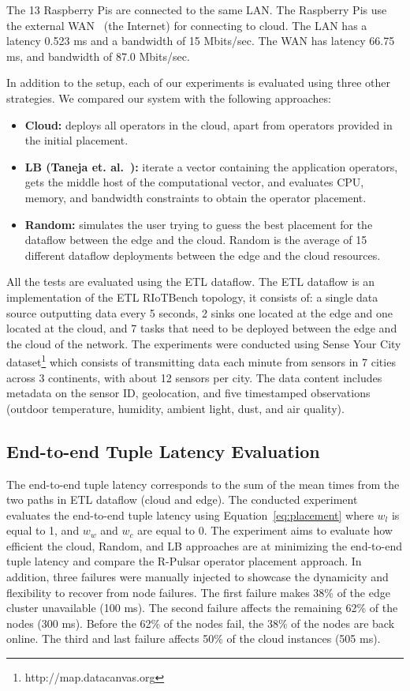 \noindent The 13 Raspberry Pis are connected to the same LAN. The Raspberry Pis use the external WAN~\cite{Ha:2013} (the Internet) for connecting to cloud. The LAN has a latency 0.523 ms and a bandwidth of 15 Mbits/sec. The WAN has latency 66.75 ms, and bandwidth of 87.0 Mbits/sec.

\noindent In addition to the setup, each of our experiments is evaluated using three other strategies. We compared our system with the following approaches:

\begin{itemize}	
\item \textbf{Cloud:} deploys all operators in the cloud, apart from operators provided in the initial placement.

\item \textbf{LB (Taneja et. al.~\cite{Taneja:2017}):} iterate a vector containing the application operators, gets the middle host of the computational vector, and evaluates CPU, memory, and bandwidth constraints to obtain the operator placement.

\item \textbf{Random:} simulates the user trying to guess the best placement for the dataflow between the edge and the cloud. Random is the average of 15 different dataflow deployments between the edge and the cloud resources.
\end{itemize}

\noindent All the tests are evaluated using the ETL dataflow. The ETL dataflow is an implementation of the ETL RIoTBench topology, it consists of: a single data source outputting data every 5 seconds, 2 sinks one located at the edge and one located at the cloud, and 7 tasks that need to be deployed between the edge and the cloud of the network. The experiments were conducted using Sense Your City dataset\footnote{http://map.datacanvas.org} which consists of transmitting data each minute from sensors in 7 cities across 3 continents, with about 12 sensors per city. The data content includes metadata on the sensor ID, geolocation, and five timestamped observations (outdoor temperature, humidity, ambient light, dust, and air quality).
\subsection{End-to-end Tuple Latency Evaluation}

The end-to-end tuple latency corresponds to the sum of the mean times from the two paths in ETL dataflow (cloud and edge). The conducted experiment evaluates the end-to-end tuple latency using Equation~\ref{eq:placement} where $w_l$ is equal to 1, and $w_w$ and $w_c$ are equal to 0. The experiment aims to evaluate how efficient the cloud, Random, and LB approaches are at minimizing the end-to-end tuple latency and compare the R-Pulsar operator placement approach. In addition, three failures were manually injected to showcase the dynamicity and flexibility to recover from node failures. The first failure makes 38\% of the edge cluster unavailable (100 ms). The second failure affects the remaining 62\% of the nodes (300 ms). Before the 62\% of the nodes fail, the 38\% of the nodes are back online. The third and last failure affects 50\% of the cloud instances (505 ms).

